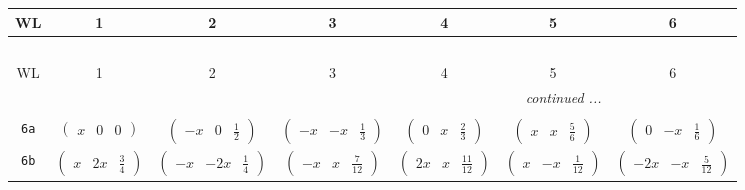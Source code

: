 \documentclass[fleqn,9pt,landscape]{jsarticle}
\begin{document}
\begin{center}
\renewcommand{\arraystretch}{1.2}
\begin{longtable}{ccccccc}
 \hline \hline
WL & 1 & 2 & 3 & 4 & 5 & 6 \\ \hline \endfirsthead

\multicolumn{6}{l}{\tablename\ \thetable{}} \\
 \hline \hline
WL & 1 & 2 & 3 & 4 & 5 & 6 \\ \hline \endhead

 \hline \hline
\multicolumn{6}{r}{\footnotesize\it continued ...} \\ \endfoot

 \hline \hline
\multicolumn{6}{r}{} \\ \endlastfoot

{\tt 6a} & $ \begin{pmatrix} x & 0 & 0 \end{pmatrix} $ & $ \begin{pmatrix} - x & 0 & \frac{1}{2} \end{pmatrix} $ & $ \begin{pmatrix} - x & - x & \frac{1}{3} \end{pmatrix} $ & $ \begin{pmatrix} 0 & x & \frac{2}{3} \end{pmatrix} $ & $ \begin{pmatrix} x & x & \frac{5}{6} \end{pmatrix} $ & $ \begin{pmatrix} 0 & - x & \frac{1}{6} \end{pmatrix} $ \\ \hline
{\tt 6b} & $ \begin{pmatrix} x & 2 x & \frac{3}{4} \end{pmatrix} $ & $ \begin{pmatrix} - x & - 2 x & \frac{1}{4} \end{pmatrix} $ & $ \begin{pmatrix} - x & x & \frac{7}{12} \end{pmatrix} $ & $ \begin{pmatrix} 2 x & x & \frac{11}{12} \end{pmatrix} $ & $ \begin{pmatrix} x & - x & \frac{1}{12} \end{pmatrix} $ & $ \begin{pmatrix} - 2 x & - x & \frac{5}{12} \end{pmatrix} $ \\ \hline

\end{longtable}
\end{center}
\end{document}
